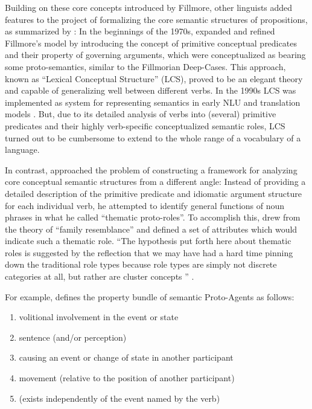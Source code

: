 Building on these core concepts introduced by Fillmore, other linguists added features to
the project of formalizing the core semantic structures of propositions, as summarized by
\citeauthor{palmer2010semantic}: In the beginnings of the 1970s, \cite{jackendoff1972semantic}
expanded and refined Fillmore's model by introducing the concept of primitive conceptual
predicates and their property of governing arguments, which were conceptualized as bearing
some proto-semantics, similar to the Fillmorian Deep-Cases. This approach, known as ``Lexical
Conceptual Structure'' (LCS), proved to be an elegant theory and capable of generalizing
well between different verbs. In the 1990s LCS was implemented as system for representing
semantics in early NLU and translation models \citep{palmer2010semantic}. But, due to its
detailed analysis of verbs into (several) primitive predicates and their highly verb-specific
conceptualized semantic roles, LCS turned out to be cumbersome to extend to the whole range of
a vocabulary of a language.

In contrast, \cite{dowty1991thematic} approached the problem of constructing a framework for
analyzing core conceptual semantic structures from a different angle: Instead of providing
a detailed description of the primitive predicate and idiomatic argument structure for each
individual verb, he attempted to identify general functions of noun phrases in what he called
``thematic proto-roles''. To accomplish this, \citeauthor{dowty1991thematic} drew from the
theory of ``family resemblance'' and defined a set of attributes which would indicate such
a thematic role. ``The hypothesis put forth here about thematic roles is suggested by the
reflection that we may have had a hard time pinning down the traditional role types because
role types are simply not discrete categories at all, but rather are cluster concepts
\textelp{}'' \citep[p.~571]{dowty1991thematic}.

For example, \citep[p.~572]{dowty1991thematic} defines the property bundle of semantic Proto-Agents
as follows:

\begin{enumerate}[label=\alph*]
  \item volitional involvement in the event or state
  \item sentence (and/or perception)
  \item causing an event or change of state in another participant
  \item movement (relative to the position of another participant)
  \item (exists independently of the event named by the verb)
\end{enumerate}

